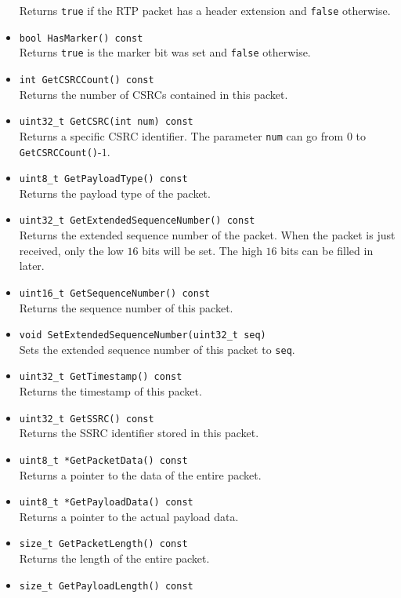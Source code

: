 \documentclass[12pt,a4paper]{article}
\begin{document}
\begin{itemize}
						Returns {\tt true} if the RTP packet has a header extension and
						{\tt false} otherwise.
					\item {\tt bool HasMarker() const}\\
						Returns {\tt true} is the marker bit was set and {\tt false}
						otherwise.
					\item {\tt int GetCSRCCount() const}\\
						Returns the number of CSRCs contained in this packet.
					\item {\tt uint32\_t GetCSRC(int num) const}\\
						Returns a specific CSRC identifier. The parameter {\tt num} 
						can go from $0$ to {\tt GetCSRCCount()}-$1$.
					\item {\tt uint8\_t GetPayloadType() const}\\
						Returns the payload type of the packet.
					\item {\tt uint32\_t GetExtendedSequenceNumber() const}\\
						Returns the extended sequence number of the packet. When
						the packet is just received, only the low $16$ bits will
						be set. The high $16$ bits can be filled in later.
					\item {\tt uint16\_t GetSequenceNumber() const}\\
						Returns the sequence number of this packet.
					\item {\tt void SetExtendedSequenceNumber(uint32\_t seq)}\\
						Sets the extended sequence number of this packet to {\tt seq}.
					\item {\tt uint32\_t GetTimestamp() const}\\
						Returns the timestamp of this packet.
					\item {\tt uint32\_t GetSSRC() const}\\
						Returns the SSRC identifier stored in this packet.
					\item {\tt uint8\_t *GetPacketData() const}\\
						Returns a pointer to the data of the entire packet.
					\item {\tt uint8\_t *GetPayloadData() const}\\
						Returns a pointer to the actual payload data.
					\item {\tt size\_t GetPacketLength() const}\\
						Returns the length of the entire packet.
					\item {\tt size\_t GetPayloadLength() const}\\

\end{itemize}
\end{document}
